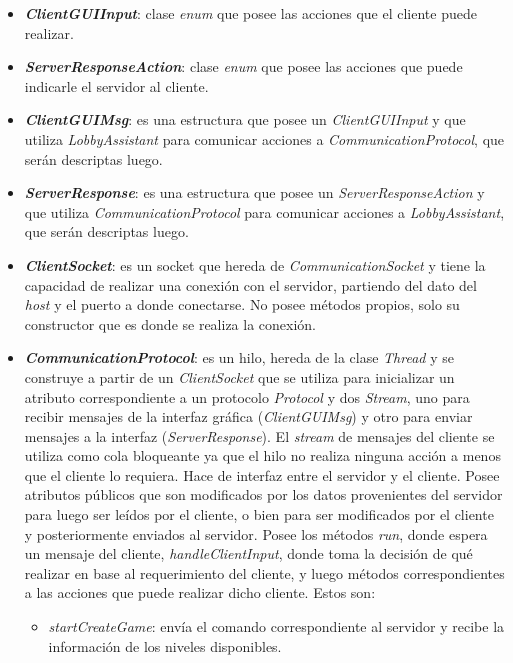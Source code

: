 \begin{itemize}
	\item \textbf{\textit{ClientGUIInput}}: clase \textit{enum} que posee las acciones que el cliente puede realizar.

	\item \textbf{\textit{ServerResponseAction}}: clase \textit{enum} que posee las acciones que puede indicarle el servidor al cliente.

	\item \textbf{\textit{ClientGUIMsg}}: es una estructura que posee un \textit{ClientGUIInput} y que utiliza \textit{LobbyAssistant} para comunicar acciones a \textit{CommunicationProtocol}, que serán descriptas luego.

	\item \textbf{\textit{ServerResponse}}: es una estructura que posee un \textit{ServerResponseAction} y que utiliza \textit{CommunicationProtocol} para comunicar acciones a \textit{LobbyAssistant}, que serán descriptas luego.

	\item \textbf{\textit{ClientSocket}}: es un socket que hereda de \textit{CommunicationSocket} y tiene la capacidad de realizar una conexión con el servidor, partiendo del dato del \textit{host} y el puerto a donde conectarse. No posee métodos propios, solo su constructor que es donde se realiza la conexión.

	\item \textbf{\textit{CommunicationProtocol}}: es un hilo, hereda de la clase \textit{Thread} y se construye a partir de un \textit{ClientSocket} que se utiliza para inicializar un atributo correspondiente a un protocolo \textit{Protocol} y dos \textit{Stream}, uno para recibir mensajes de la interfaz gráfica (\textit{ClientGUIMsg}) y otro para enviar mensajes a la interfaz (\textit{ServerResponse}). El \textit{stream} de mensajes del cliente se utiliza como cola bloqueante ya que el hilo no realiza ninguna acción a menos que el cliente lo requiera. Hace de interfaz entre el servidor y el cliente. Posee atributos públicos que son modificados por los datos provenientes del servidor para luego ser leídos por el cliente, o bien para ser modificados por el cliente y posteriormente enviados al servidor. Posee los métodos \textit{run}, donde espera un mensaje del cliente, \textit{handleClientInput}, donde toma la decisión de qué realizar en base al requerimiento del cliente, y luego métodos correspondientes a las acciones que puede realizar dicho cliente. Estos son: \begin{itemize}
		\item \textit{startCreateGame}: envía el comando correspondiente al servidor y recibe la información de los niveles disponibles.


\end{itemize}
\end{itemize}
